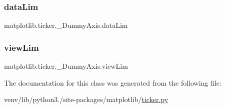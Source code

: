 \subsubsection{\texorpdfstring{data\+Lim}{dataLim}}
{\footnotesize\ttfamily matplotlib.\+ticker.\+\_\+\+Dummy\+Axis.\+data\+Lim}

\mbox{\label{classmatplotlib_1_1ticker_1_1__DummyAxis_aa3b444e00cf8bc53a9e207ce45d1bc9f}} 
\subsubsection{\texorpdfstring{view\+Lim}{viewLim}}
{\footnotesize\ttfamily matplotlib.\+ticker.\+\_\+\+Dummy\+Axis.\+view\+Lim}



The documentation for this class was generated from the following file\+:\begin{DoxyCompactItemize}
\item 
venv/lib/python3./site-\/packages/matplotlib/\hyperlink{ticker_8py}{ticker.\+py}\end{DoxyCompactItemize}
